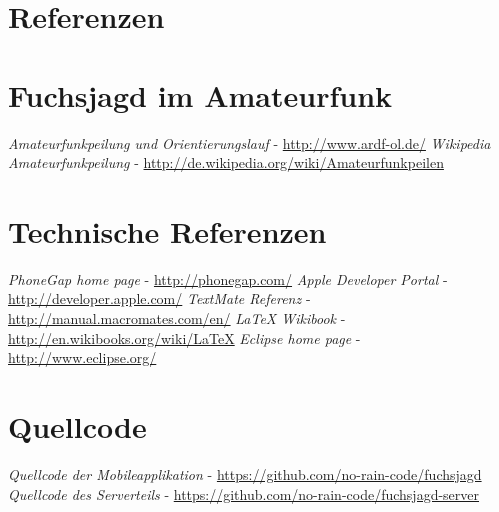 
\newpage
\section{Referenzen} %
\label{sec:referenzen}

\begin{thebibliography}{breitestes Label}

\section*{Fuchsjagd im Amateurfunk}
    \textit{Amateurfunkpeilung und Orientierungslauf} - \url{http://www.ardf-ol.de/}
    \textit{Wikipedia Amateurfunkpeilung} - \url{http://de.wikipedia.org/wiki/Amateurfunkpeilen}
\section*{Technische Referenzen}
    \textit{PhoneGap home page} - \url{http://phonegap.com/}
    \textit{Apple Developer Portal} - \url{http://developer.apple.com/}
    \textit{TextMate Referenz} - \url{http://manual.macromates.com/en/}
    \textit{LaTeX Wikibook} - \url{http://en.wikibooks.org/wiki/LaTeX}
    \textit{Eclipse home page} - \url{http://www.eclipse.org/}
\section*{Quellcode}
    \textit{Quellcode der Mobileapplikation} - \url{https://github.com/no-rain-code/fuchsjagd}
    \textit{Quellcode des Serverteils} - \url{https://github.com/no-rain-code/fuchsjagd-server}

\end{thebibliography}

